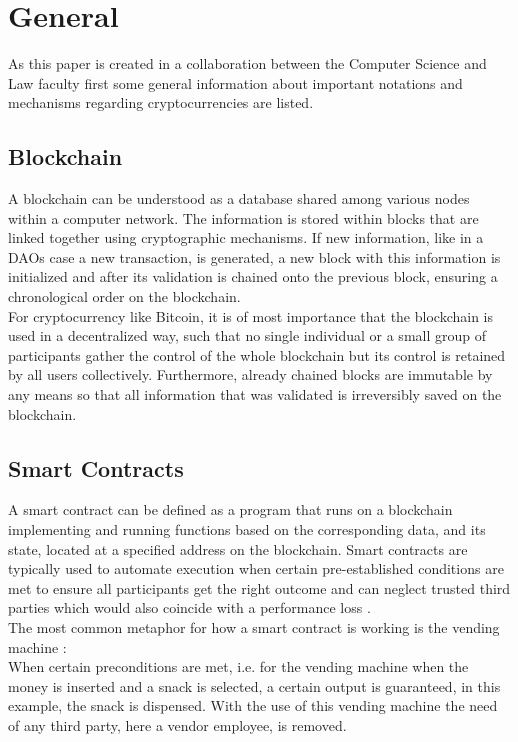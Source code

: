 \documentclass[a4paper,12pt]{report}
\begin{document}
	\section{General}
	\startsection
	    As this paper is created in a collaboration between the Computer Science and Law faculty first some general information about important notations and mechanisms regarding cryptocurrencies are listed.
	    \subsection[Blockchain]{Blockchain \parencite{AH22}}
	    \startsubsection
	        A blockchain can be understood as a database shared among various nodes within a computer network. The information is stored within blocks that are linked together using cryptographic mechanisms. If new information, like in a DAOs case a new transaction, is generated, a new block with this information is initialized and after its validation is chained onto the previous block, ensuring a chronological order on the blockchain. \\
	        For cryptocurrency like Bitcoin, it is of most importance that the blockchain is used in a decentralized way, such that no single individual or a small group of participants gather the control of the whole blockchain but its control is retained by all users collectively. Furthermore, already chained blocks are immutable by any means so that all information that was validated is irreversibly saved on the blockchain.
	    \closesection
	    \subsection{Smart Contracts} \label{Smart Contracts}
	    \startsubsection
	        A smart contract can be defined as a program that runs on a blockchain implementing and running functions based on the corresponding data, and its state, located at a specified address on the blockchain. Smart contracts are typically used to automate execution when certain pre-established conditions are met to ensure all participants get the right outcome and can neglect trusted third parties which would also coincide with a performance loss \parencite{SmartContractsDef}. \\
	        The most common metaphor for how a smart contract is working is the vending machine \parencite{SmartContractsVendingMachine}: \\
	        \beginbigcite
	            When certain preconditions are met, i.e. for the vending machine when the money is inserted and a snack is selected, a certain output is guaranteed, in this example, the snack is dispensed. With the use of this vending machine the need of any third party, here a vendor employee, is removed.
	        \closebigcite
	    \closesection
\end{document}
